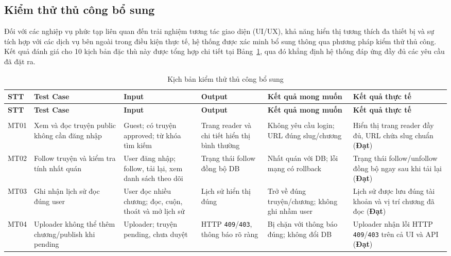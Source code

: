 \subsection{Kiểm thử thủ công bổ sung}

Đối với các nghiệp vụ phức tạp liên quan đến trải nghiệm tương tác giao diện (UI/UX), khả năng hiển thị tương thích đa thiết bị và sự tích hợp với các dịch vụ bên ngoài trong điều kiện thực tế, hệ thống được xác minh bổ sung thông qua phương pháp kiểm thử thủ công. Kết quả đánh giá cho 10 kịch bản đặc thù này được tổng hợp chi tiết tại Bảng~\ref{tab:manual-tests}, qua đó khẳng định hệ thống đáp ứng đầy đủ các yêu cầu đã đặt ra.

\begingroup
\footnotesize
\begin{longtable}{|>{\centering\arraybackslash}p{0.7cm}|>{\RaggedRight\arraybackslash}p{2.0cm}|>{\RaggedRight\arraybackslash}p{3.5cm}|>{\RaggedRight\arraybackslash}p{2.0cm}|>{\RaggedRight\arraybackslash}p{2.2cm}|>{\RaggedRight\arraybackslash}p{3.1cm}|}
\caption{Kịch bản kiểm thử thủ công bổ sung}\label{tab:manual-tests}\\
\hline
\textbf{STT} & \textbf{Test Case} & \textbf{Input} & \textbf{Output} & \textbf{Kết quả mong muốn} & \textbf{Kết quả thực tế} \\
\hline
\endfirsthead
\hline
\textbf{STT} & \textbf{Test Case} & \textbf{Input} & \textbf{Output} & \textbf{Kết quả mong muốn} & \textbf{Kết quả thực tế} \\
\hline
\endhead
\hline
\multicolumn{6}{|r|}{\emph{Còn tiếp ở trang sau}}\\
\hline
\endfoot
\hline
\endlastfoot
MT01 & Xem và đọc truyện public không cần đăng nhập & Guest; có truyện approved; từ khóa tìm kiếm & Trang reader và chi tiết hiển thị bình thường & Không yêu cầu login; URL đúng slug/\allowbreak{}chương & Hiển thị trang reader đầy đủ, URL chứa slug chuẩn (\textbf{Đạt}) \\
\hline
MT02 & Follow truyện và kiểm tra tính nhất quán & User đăng nhập; follow, tải lại, xem danh sách theo dõi & Trạng thái follow đồng bộ DB & Nhất quán với DB; lỗi mạng có rollback & Trạng thái follow/unfollow đồng bộ ngay sau khi tải lại (\textbf{Đạt}) \\
\hline
MT03 & Ghi nhận lịch sử đọc đúng user & User đọc nhiều chương; đọc, cuộn, thoát và mở lịch sử & Lịch sử hiển thị đúng & Trở về đúng truyện/chương; không ghi nhầm user & Lịch sử được lưu đúng tài khoản và vị trí chương đã đọc (\textbf{Đạt}) \\
\hline
MT04 & Uploader không thể thêm chương/publish khi pending & Uploader; truyện pending, chưa duyệt & HTTP \texttt{409}/\texttt{403}, thông báo rõ ràng & Bị chặn với thông báo đúng; không đổi DB & Uploader nhận lỗi HTTP \texttt{409}/\texttt{403} trên cả UI và API (\textbf{Đạt}) \\

\end{longtable}
